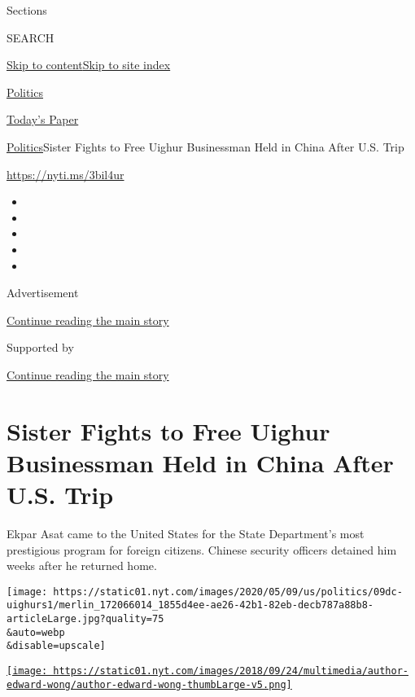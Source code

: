Sections

SEARCH

\protect\hyperlink{site-content}{Skip to
content}\protect\hyperlink{site-index}{Skip to site index}

\href{https://www.nytimes.com/section/politics}{Politics}

\href{https://myaccount.nytimes.com/auth/login?response_type=cookie\&client_id=vi}{}

\href{https://www.nytimes.com/section/todayspaper}{Today's Paper}

\href{/section/politics}{Politics}\textbar{}Sister Fights to Free Uighur
Businessman Held in China After U.S. Trip

\url{https://nyti.ms/3bil4ur}

\begin{itemize}
\item
\item
\item
\item
\item
\end{itemize}

Advertisement

\protect\hyperlink{after-top}{Continue reading the main story}

Supported by

\protect\hyperlink{after-sponsor}{Continue reading the main story}

\hypertarget{sister-fights-to-free-uighur-businessman-held-in-china-after-us-trip}{%
\section{Sister Fights to Free Uighur Businessman Held in China After
U.S.
Trip}\label{sister-fights-to-free-uighur-businessman-held-in-china-after-us-trip}}

Ekpar Asat came to the United States for the State Department's most
prestigious program for foreign citizens. Chinese security officers
detained him weeks after he returned home.

\texttt{[image: https://static01.nyt.com/images/2020/05/09/us/politics/09dc-uighurs1/merlin\_172066014\_1855d4ee-ae26-42b1-82eb-decb787a88b8-articleLarge.jpg?quality=75\\\&auto=webp\\\&disable=upscale]}

\href{https://www.nytimes.com/by/edward-wong}{\texttt{[image: https://static01.nyt.com/images/2018/09/24/multimedia/author-edward-wong/author-edward-wong-thumbLarge-v5.png]}}

